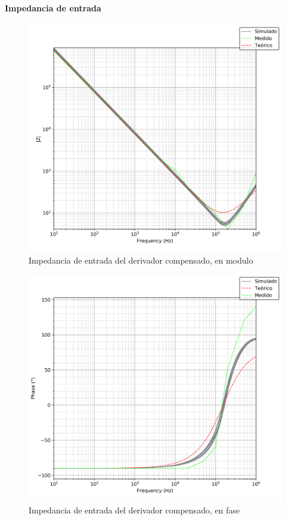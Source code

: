 \paragraph*{Impedancia de entrada}

\begin{figure}[H]
	\centering
	\includegraphics[scale=0.7]{Recursos/Derivador_compensado/impedancia_modulo.png}
	\caption{Impedancia de entrada del derivador compensado, en modulo}
	\label{fig:derivador_compensado_impedancia_modulo}
\end{figure}

\begin{figure}[H]
	\centering
	\includegraphics[scale=0.7]{Recursos/Derivador_compensado/impedancia_fase.png}
	\caption{Impedancia de entrada del derivador compensado, en fase}
	\label{fig_derivador_compensado_impedancia_fase}
\end{figure}

